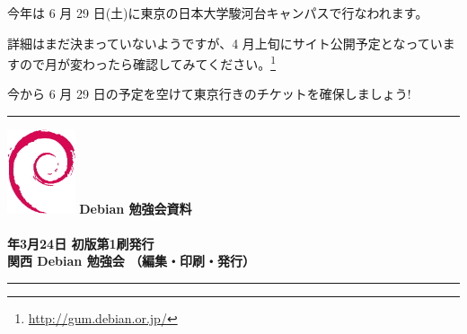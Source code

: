 \documentclass[mingoth,a4paper]{jsarticle}
\newcommand{\debmtgyear}{2013}
\newcommand{\debmtgdate}{24}
\newcommand{\debmtgmonth}{3}
\begin{document}
今年は 6 月 29 日(土)に東京の日本大学駿河台キャンパスで行なわれます。

詳細はまだ決まっていないようですが、4 月上旬にサイト公開予定となっていますので月が変わったら確認してみてください。\footnote{\url{http://gum.debian.or.jp/}}

今から 6 月 29 日の予定を空けて東京行きのチケットを確保しましょう!



\printindex

 \begin{minipage}[b]{0.2\hsize}
 \end{minipage}
 \begin{minipage}[b]{0.8\hsize}

 \vspace*{15cm}
 \rule{\hsize}{1mm}
 \vspace{2mm}
 \includegraphics[width=2cm]{image200502/openlogo-nd.eps}
 \noindent \Large \bf Debian 勉強会資料\\ \\
 \noindent \normalfont \debmtgyear{}年\debmtgmonth{}月\debmtgdate{}日 \hspace{5mm}  初版第1刷発行\\
 \noindent \normalfont 関西 Debian 勉強会 （編集・印刷・発行）\\
 \rule{\hsize}{1mm}
 \end{minipage}
\end{document}

